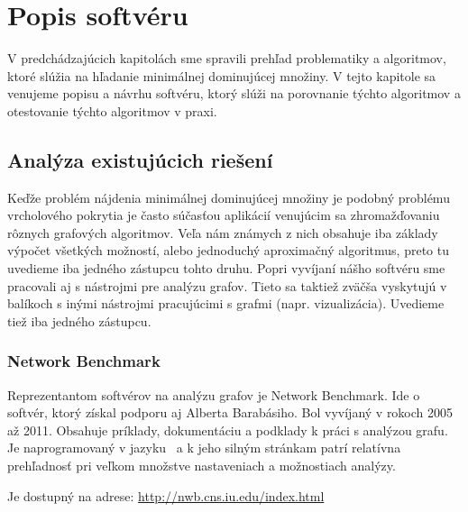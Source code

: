 \chapter{Popis softvéru}\label{chap:popis}

V predchádzajúcich kapitolách sme spravili prehľad problematiky a algoritmov, 
ktoré slúžia na hľadanie minimálnej dominujúcej množiny. V tejto kapitole sa 
venujeme popisu a návrhu softvéru, ktorý slúži na porovnanie týchto algoritmov 
a otestovanie týchto algoritmov v praxi.


\section{Analýza existujúcich riešení}

Keďže problém nájdenia minimálnej dominujúcej množiny je podobný problému 
vrcholového pokrytia je často súčasťou aplikácií venujúcim sa zhromažďovaniu 
rôznych grafových algoritmov. Veľa nám známych z nich obsahuje iba základy 
výpočet všetkých možností, alebo jednoduchý aproximačný algoritmus, preto 
tu uvedieme iba jedného zástupcu tohto druhu. Popri vyvíjaní nášho 
softvéru sme pracovali aj s nástrojmi pre analýzu grafov. Tieto sa taktiež 
zväčša vyskytujú v balíkoch s inými nástrojmi pracujúcimi s grafmi (napr. 
vizualizácia). Uvedieme tiež iba jedného zástupcu.


\subsection{Network Benchmark}

Reprezentantom softvérov na analýzu grafov je Network Benchmark. Ide o softvér, 
ktorý získal podporu aj Alberta Barabásiho. Bol vyvíjaný v rokoch 2005 až 2011. 
Obsahuje príklady, dokumentáciu a podklady k práci s analýzou grafu. Je 
naprogramovaný v jazyku \Java\ a k jeho silným stránkam patrí relatívna 
prehľadnosť pri veľkom množstve nastaveniach a možnostiach analýzy. 

Je dostupný na adrese: \url{http://nwb.cns.iu.edu/index.html}

